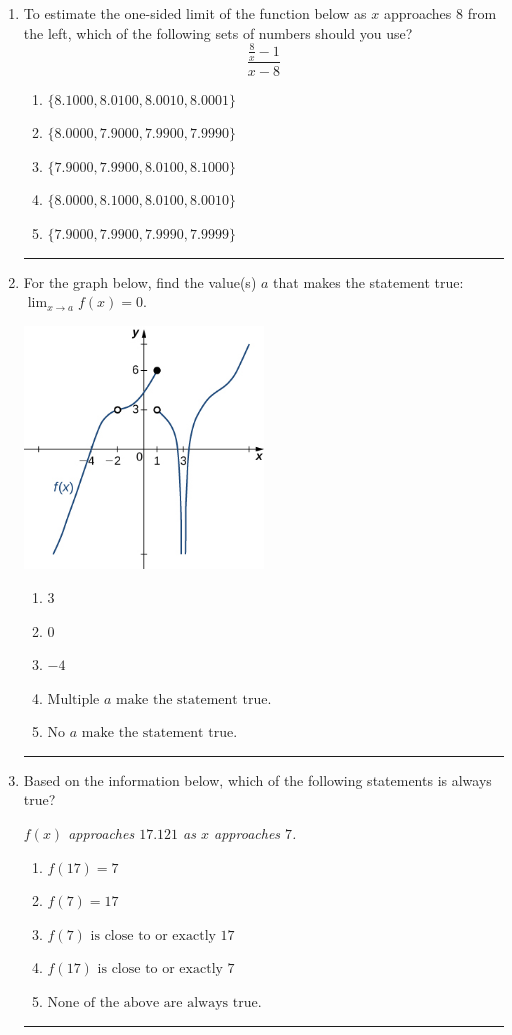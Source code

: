 \documentclass[14pt]{extbook}
\newcommand{\litem}[1]{\item#1\hspace*{-1cm}\rule{\textwidth}{0.4pt}}
\begin{document}
\begin{enumerate}
{\begin{enumerate}[label=\Alph*.]
\end{enumerate} }
\litem{
To estimate the one-sided limit of the function below as $x$ approaches 8 from the left, which of the following sets of numbers should you use?\[ \frac{\frac{8}{x} - 1}{x - 8} \]\begin{enumerate}[label=\Alph*.]
\item \( \{ 8.1000, 8.0100, 8.0010, 8.0001 \} \)
\item \( \{ 8.0000, 7.9000, 7.9900, 7.9990 \} \)
\item \( \{ 7.9000, 7.9900, 8.0100, 8.1000 \} \)
\item \( \{ 8.0000, 8.1000, 8.0100, 8.0010 \} \)
\item \( \{ 7.9000, 7.9900, 7.9990, 7.9999 \} \)

\end{enumerate} }
\litem{
For the graph below, find the value(s) $a$ that makes the statement true: $ \displaystyle \lim_{x \rightarrow a} f(x) = 0$.
\begin{center}
    \includegraphics[width=0.5\textwidth]{../Figures/evaluateLimitGraphicallyC.png}
\end{center}
\begin{enumerate}[label=\Alph*.]
\item \( 3 \)
\item \( 0 \)
\item \( -4 \)
\item \( \text{Multiple } a \text{ make the statement true}. \)
\item \( \text{No } a \text{ make the statement true}. \)

\end{enumerate} }
\litem{
Based on the information below, which of the following statements is always true?
\begin{center}
    \textit{ $f(x)$ approaches $17.121$ as $x$ approaches $7$. }
\end{center}
\begin{enumerate}[label=\Alph*.]
\item \( f(17) = 7 \)
\item \( f(7) = 17 \)
\item \( f(7) \text{ is close to or exactly } 17 \)
\item \( f(17) \text{ is close to or exactly } 7 \)
\item \( \text{None of the above are always true.} \)


\end{enumerate}}
\end{enumerate}
\end{document}
